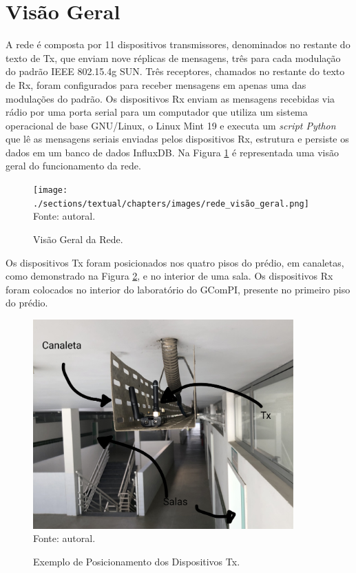 \section{Visão Geral}
\label{subsec:visaogeral}
A rede é composta por 11 dispositivos transmissores, denominados no restante do texto de Tx, que enviam nove réplicas de mensagens, três para cada modulação do padrão IEEE 802.15.4g SUN. Três receptores, chamados no restante do texto de Rx, foram configurados para receber mensagens em apenas uma das modulações do padrão. Os dispositivos Rx enviam as mensagens recebidas via rádio por uma porta serial para um computador que utiliza um sistema operacional de base GNU/Linux, o Linux Mint 19 e executa um \emph{script Python} que lê as mensagens seriais enviadas pelos dispositivos Rx, estrutura e persiste os dados em um banco de dados InfluxDB. Na Figura \ref{fig:rede_visão_geral} é representada uma visão geral do funcionamento da rede.

\begin{figure}[h]
  \begin{center}
    \caption{Visão Geral da Rede.}
    \texttt{[image: ./sections/textual/chapters/images/rede\_visão\_geral.png]}\\
    Fonte: autoral.
    \label{fig:rede_visão_geral}
  \end{center}
\end{figure}

Os dispositivos Tx foram posicionados nos quatro pisos do prédio, em canaletas, como demonstrado na Figura \ref{fig:tx_canaleta}, e no interior de uma sala. Os dispositivos Rx foram colocados no interior do laboratório do GComPI, presente no primeiro piso do prédio.

\begin{figure}[h]
  \begin{center}
    \caption{Exemplo de Posicionamento dos Dispositivos Tx.}
    \includegraphics[width=10cm]{./sections/textual/chapters/images/tx_canaleta.jpg}\\
    Fonte: autoral.
    \label{fig:tx_canaleta}
  \end{center}
\end{figure}


